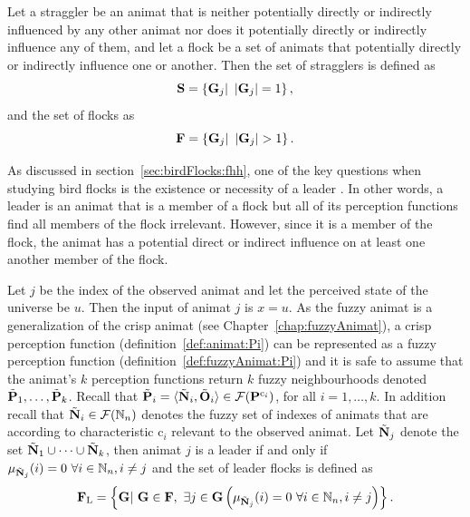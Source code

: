 Let a straggler be an animat that is neither potentially directly or indirectly influenced by any other animat nor does it potentially directly or indirectly influence any of them, and let a flock be a set of animats that potentially directly or indirectly influence one or another. Then the set of stragglers is defined as 
%
\begin{equation}
\set{S}=\left\{ \set{G}_j|\ \left|\set{G}_j\right|=1 \right\}, \label{eq:stragglers}
\end{equation}
%
and the set of flocks as
%
\begin{equation}
\set{F}=\left\{ \set{G}_j|\ \left|\set{G}_j\right|>1 \right\}. \label{eq:metric:flocks}
\end{equation}

As discussed in section~\ref{sec:birdFlocks:fhh}, one of the key questions when studying bird flocks is the existence or necessity of a leader \cite{heppner:1997}.  In other words, a leader is an animat that is a member of a flock but all of its perception functions find all members of the flock irrelevant. However, since it is a member of the flock, the animat has a potential direct or indirect influence on at least one another member of the flock. 

Let $j$ be the index of the observed animat and let the perceived state of the universe be $u$. Then the input of animat $j$ is $x=u$.
As the fuzzy animat is a generalization of the crisp animat (see Chapter~\ref{chap:fuzzyAnimat}), a crisp perception function (definition~\ref{def:animat:Pi}) can be represented as a fuzzy perception function (definition~\ref{def:fuzzyAnimat:Pi}) and it is safe to assume that the animat's $k$ perception functions return $k$ fuzzy neighbourhoods denoted ${\tilde{{\mathbf{P}}}}_1,\ldots,{\tilde{{\mathbf{P}}}}_k$. Recall that ${\tilde{{\mathbf{P}}}}_i=\langle{\ensuremath{\tilde{{\mathbf{N}}}}}_i,{\tilde{{\mathbf{O}}}}_i\rangle \in {\ensuremath{\mathcal{F}({\mathbf{P}}^{\mathrm{c}_i})}}$, for all $i=1,\ldots,k$. In addition recall that ${\tilde{{\mathbf{N}}}}_i \in {\ensuremath{\mathcal{F}(\mathbb{N}_n)}}$ denotes the fuzzy set of indexes of animats that are according to characteristic $\mathrm{c}_i$ relevant to the observed animat. Let ${\tilde{{\mathbf{N}}}}_j$ denote the set ${\tilde{{\mathbf{N}}}}_1 \cup \cdots \cup {\ensuremath{\tilde{{\mathbf{N}}}}}_k$, then animat $j$ is a leader if and only if $\mu_{{\tilde{{\mathbf{N}}}}_j}(i)=0\ \forall i \in \mathbb{N}_n, i \neq j$ and the set of leader flocks is defined as 
%
\begin{equation}
{\ensuremath{\mathbf{F}}}_\mathrm{L}=\left\{ {\mathbf{G}}|\ {\mathbf{G}} \in {\ensuremath{\mathbf{F}}},\ \exists j \in {\ensuremath{\mathbf{G}}}\left(\mu_{{\tilde{{\mathbf{N}}}}_j}(i)=0\ \forall i \in \mathbb{N}_n, i \neq j\right) \right\}. \label{eq:metric:FL}
\end{equation}


